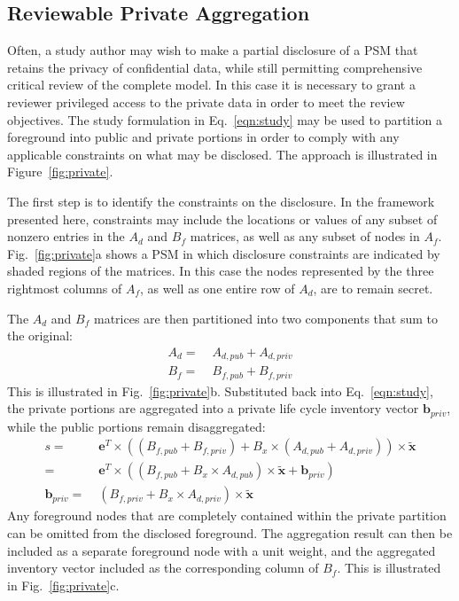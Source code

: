\subsection{Reviewable Private Aggregation}



Often, a study author may wish to make a partial disclosure of a PSM that retains the privacy of confidential data, while still permitting comprehensive critical review of the complete model.  In this case it is necessary to grant a reviewer privileged access to the private data in order to meet the review objectives.  The study formulation in Eq.~\ref{eqn:study} may be used to partition a foreground into public and private portions in order to comply with any applicable constraints on what may be disclosed.  The approach is illustrated in Figure~\ref{fig:private}.

The first step is to identify the constraints on the disclosure.  In the framework presented here, constraints may include the locations or values of any subset of nonzero entries in the $A_d$ and $B_f$ matrices, as well as any subset of nodes in $A_f$.  Fig.~\ref{fig:private}a shows a PSM in which disclosure constraints are indicated by shaded regions of the matrices.  In this case the nodes represented by the three rightmost columns of $A_f$, as well as one entire row of $A_d$, are to remain secret.  

The $A_d$ and $B_f$ matrices are then partitioned into two components that sum to the original:
\begin{equation}\begin{aligned}
  A_d =\; & A_{d,pub} + A_{d,priv} \\
  B_f =\; & B_{f,pub} + B_{f,priv}
  \label{eqn:partition}
  \end{aligned}
  \end{equation}
This is illustrated in Fig.~\ref{fig:private}b.  Substituted back into Eq.~\ref{eqn:study}, the private portions are aggregated into a private life cycle inventory vector $\mathbf{b}_{priv}$, while the public portions remain disaggregated:
\begin{align}
  s =\; & \mathbf{e}^T\times\left((B_{f,pub} + B_{f,priv}) + B_x\times (A_{d,pub} + A_{d,priv})\right)\times\tilde{\mathbf{x}}\\
  =\; & \mathbf{e}^T\times\left((B_{f,pub} + B_x\times A_{d,pub})\times\tilde{\mathbf{x}} + \mathbf{b}_{priv}\right)\label{eqn:private}\\
  \mathbf{b}_{priv} =\; & (B_{f,priv} + B_x\times A_{d,priv})\times \tilde{\mathbf{x}}
\end{align}
Any foreground nodes that are completely contained within the private partition can be omitted from the disclosed foreground.  The aggregation result can then be included as a separate foreground node with a unit weight, and the aggregated inventory vector included as the corresponding column of $B_f$.  This is illustrated in Fig.~\ref{fig:private}c.


